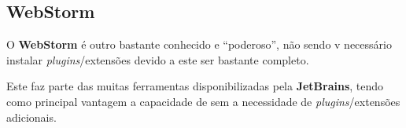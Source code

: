 \subsection{WebStorm}

\begin{minipage}{.3\textwidth}
\end{minipage}
\begin{minipage}{.7\textwidth}
	\minipagerestore
	O \textbf{WebStorm} é outro  bastante conhecido e ``poderoso'', não sendo v		necessário instalar \textit{plugins}/extensões devido a este ser bastante completo.
	
	Este  faz parte das muitas ferramentas disponibilizadas pela \textbf{JetBrains}, tendo como principal vantagem a capacidade de \textit{} sem a necessidade de \textit{plugins}/extensões adicionais.

\end{minipage}

